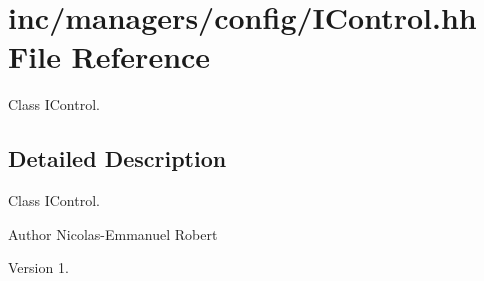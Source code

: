 \hypertarget{IControl_8hh}{}\section{inc/managers/config/\+I\+Control.hh File Reference}
\label{IControl_8hh}


Class I\+Control.  




\subsection{Detailed Description}
Class I\+Control. 

\begin{DoxyAuthor}{Author}
Nicolas-\/\+Emmanuel Robert 
\end{DoxyAuthor}
\begin{DoxyVersion}{Version}
1. 
\end{DoxyVersion}
